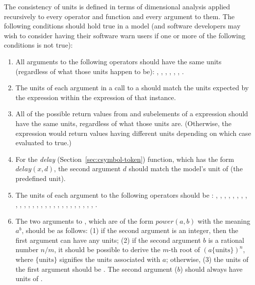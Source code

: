 The consistency of units is defined in terms of
dimensional analysis applied recursively to every operator and
function and every argument to them.  The following
conditions should hold true in a model (and software
developers may wish to consider having their software warn users
if one or more of the following conditions is not true):

\begin{enumerate}

\item All arguments to the following operators should have the same
  units (regardless of what those units happen to be):
  , , ,  ,
  , , .

\item The units of each argument in a call to a
  \FunctionDefinition should match the units expected by the
   expression within the  expression of
  that \FunctionDefinition instance.


\item All of the possible return values from  and
   subelements of a  expression
  should have the same units, regardless of what those units are.
  (Otherwise, the  expression would return values
  having different units depending on which case evaluated to
  true.)

\item For the \emph{delay} 
  (Section~\ref{sec:csymbol-token}) function, which has the form
  $delay(x, d)$, the second argument $d$ should match the model's
  unit of  (\ie the  predefined unit).

\item The units of each argument to the following operators should
  be : , , ,
  , , , ,
  , , , ,
  , , , ,
  , , , ,
  , , , ,
  , , ,
  , .

\item The two arguments to , which are of the form
  $\textit{power}(a,b)$ with the meaning $a^b$, should be as
  follows: (1) if the second argument is an integer, then the
  first argument can have any units; (2) if the second argument
  $b$ is a rational number $n/m$, it should be possible to derive
  the $m$-th root of $(a \{\text{units}\})^n$, where
  $\{\text{units}\}$ signifies the units associated with $a$;
  otherwise, (3) the units of the first argument should be
  .  The second argument ($b$) should always
  have units of .


\end{enumerate}
